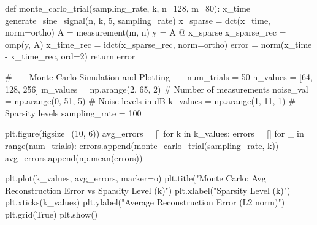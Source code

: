 \documentclass[
  letterpaper,
  DIV=11,
  numbers=noendperiod]{scrartcl}
\newenvironment{Shaded}{\begin{snugshade}}{\end{snugshade}}
\newcommand{\BuiltInTok}[1]{\textcolor[rgb]{0.40,0.85,0.94}{#1}}
\newcommand{\CommentTok}[1]{\textcolor[rgb]{0.46,0.44,0.37}{#1}}
\newcommand{\ControlFlowTok}[1]{\textcolor[rgb]{0.98,0.15,0.45}{#1}}
\newcommand{\DecValTok}[1]{\textcolor[rgb]{0.68,0.51,1.00}{#1}}
\newcommand{\KeywordTok}[1]{\textcolor[rgb]{0.98,0.15,0.45}{#1}}
\newcommand{\NormalTok}[1]{\textcolor[rgb]{0.97,0.97,0.95}{#1}}
\newcommand{\OperatorTok}[1]{\textcolor[rgb]{0.97,0.97,0.95}{#1}}
\newcommand{\StringTok}[1]{\textcolor[rgb]{0.90,0.86,0.45}{#1}}
\newcommand{\VariableTok}[1]{\textcolor[rgb]{0.97,0.97,0.95}{#1}}
\begin{document}
\begin{Shaded}
\begin{Highlighting}[]
\KeywordTok{def}\NormalTok{ monte\_carlo\_trial(sampling\_rate, k, n}\OperatorTok{=}\DecValTok{128}\NormalTok{, m}\OperatorTok{=}\DecValTok{80}\NormalTok{):}
\NormalTok{    x\_time }\OperatorTok{=}\NormalTok{ generate\_sine\_signal(n, k, }\DecValTok{5}\NormalTok{, sampling\_rate)}
\NormalTok{    x\_sparse }\OperatorTok{=}\NormalTok{ dct(x\_time, norm}\OperatorTok{=}\StringTok{\textquotesingle{}ortho\textquotesingle{}}\NormalTok{)}
\NormalTok{    A }\OperatorTok{=}\NormalTok{ measurement(m, n)}
\NormalTok{    y }\OperatorTok{=}\NormalTok{ A }\OperatorTok{@}\NormalTok{ x\_sparse}
\NormalTok{    x\_sparse\_rec }\OperatorTok{=}\NormalTok{ omp(y, A)}
\NormalTok{    x\_time\_rec }\OperatorTok{=}\NormalTok{ idct(x\_sparse\_rec, norm}\OperatorTok{=}\StringTok{\textquotesingle{}ortho\textquotesingle{}}\NormalTok{)}
\NormalTok{    error }\OperatorTok{=}\NormalTok{ norm(x\_time }\OperatorTok{{-}}\NormalTok{ x\_time\_rec, }\BuiltInTok{ord}\OperatorTok{=}\DecValTok{2}\NormalTok{)}
    \ControlFlowTok{return}\NormalTok{ error}
    
\CommentTok{\# {-}{-}{-}{-} Monte Carlo Simulation and Plotting {-}{-}{-}{-}}
\NormalTok{num\_trials }\OperatorTok{=} \DecValTok{50}
\NormalTok{n\_values }\OperatorTok{=}\NormalTok{ [}\DecValTok{64}\NormalTok{, }\DecValTok{128}\NormalTok{, }\DecValTok{256}\NormalTok{]}
\NormalTok{m\_values }\OperatorTok{=}\NormalTok{ np.arange(}\DecValTok{2}\NormalTok{, }\DecValTok{65}\NormalTok{, }\DecValTok{2}\NormalTok{)  }\CommentTok{\# Number of measurements}
\NormalTok{noise\_val }\OperatorTok{=}\NormalTok{ np.arange(}\DecValTok{0}\NormalTok{, }\DecValTok{51}\NormalTok{, }\DecValTok{5}\NormalTok{)  }\CommentTok{\# Noise levels in dB}
\NormalTok{k\_values }\OperatorTok{=}\NormalTok{ np.arange(}\DecValTok{1}\NormalTok{, }\DecValTok{11}\NormalTok{, }\DecValTok{1}\NormalTok{)  }\CommentTok{\# Sparsity levels}
\NormalTok{sampling\_rate }\OperatorTok{=} \DecValTok{100}

\NormalTok{plt.figure(figsize}\OperatorTok{=}\NormalTok{(}\DecValTok{10}\NormalTok{, }\DecValTok{6}\NormalTok{))}
\NormalTok{avg\_errors }\OperatorTok{=}\NormalTok{ []}
\ControlFlowTok{for}\NormalTok{ k }\KeywordTok{in}\NormalTok{ k\_values:}
\NormalTok{    errors }\OperatorTok{=}\NormalTok{ []}
    \ControlFlowTok{for}\NormalTok{ \_ }\KeywordTok{in} \BuiltInTok{range}\NormalTok{(num\_trials):}
\NormalTok{        errors.append(monte\_carlo\_trial(sampling\_rate, k))}
\NormalTok{    avg\_errors.append(np.mean(errors))  }

\NormalTok{plt.plot(k\_values, avg\_errors, marker}\OperatorTok{=}\StringTok{\textquotesingle{}o\textquotesingle{}}\NormalTok{)}
\NormalTok{plt.title(}\StringTok{"Monte Carlo: Avg Reconstruction Error vs Sparsity Level (k)"}\NormalTok{)}
\NormalTok{plt.xlabel(}\StringTok{"Sparsity Level (k)"}\NormalTok{)}
\NormalTok{plt.xticks(k\_values)}
\NormalTok{plt.ylabel(}\StringTok{"Average Reconstruction Error (L2 norm)"}\NormalTok{)}
\NormalTok{plt.grid(}\VariableTok{True}\NormalTok{)}
\NormalTok{plt.show()}
\end{Highlighting}
\end{Shaded}
\end{document}

